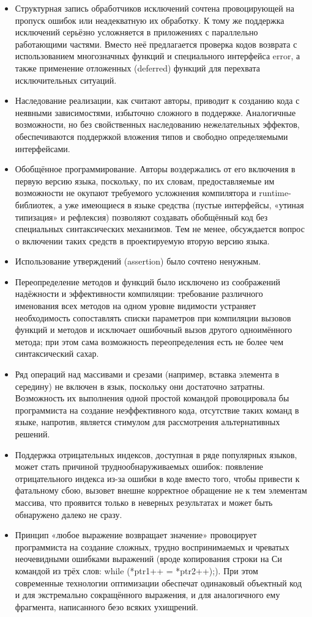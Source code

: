 \begin{itemize}
    \item Структурная запись обработчиков исключений сочтена провоцирующей на пропуск ошибок или неадекватную их обработку. К тому же поддержка исключений серьёзно усложняется в приложениях с параллельно работающими частями. Вместо неё предлагается проверка кодов возврата с использованием многозначных функций и специального интерфейса error, а также применение отложенных (deferred) функций для перехвата исключительных ситуаций.
    \item Наследование реализации, как считают авторы, приводит к созданию кода с неявными зависимостями, избыточно сложного в поддержке. Аналогичные возможности, но без свойственных наследованию нежелательных эффектов, обеспечиваются поддержкой вложения типов и свободно определяемыми интерфейсами.
    \item Обобщённое программирование. Авторы воздержались от его включения в первую версию языка, поскольку, по их словам, предоставляемые им возможности не окупают требуемого усложнения компилятора и runtime-библиотек, а уже имеющиеся в языке средства (пустые интерфейсы, «утиная типизация» и рефлексия) позволяют создавать обобщённый код без специальных синтаксических механизмов. Тем не менее, обсуждается вопрос о включении таких средств в проектируемую вторую версию языка.
    \item Использование утверждений (assertion) было сочтено ненужным.
    \item Переопределение методов и функций было исключено из соображений надёжности и эффективности компиляции: требование различного именования всех методов на одном уровне видимости устраняет необходимость сопоставлять списки параметров при компиляции вызовов функций и методов и исключает ошибочный вызов другого одноимённого метода; при этом сама возможность переопределения есть не более чем синтаксический сахар.
    \item Ряд операций над массивами и срезами (например, вставка элемента в середину) не включен в язык, поскольку они достаточно затратны. Возможность их выполнения одной простой командой провоцировала бы программиста на создание неэффективного кода, отсутствие таких команд в языке, напротив, является стимулом для рассмотрения альтернативных решений.
    \item Поддержка отрицательных индексов, доступная в ряде популярных языков, может стать причиной труднообнаруживаемых ошибок: появление отрицательного индекса из-за ошибки в коде вместо того, чтобы привести к фатальному сбою, вызовет внешне корректное обращение не к тем элементам массива, что проявится только в неверных результатах и может быть обнаружено далеко не сразу.
    \item Принцип «любое выражение возвращает значение» провоцирует программиста на создание сложных, трудно воспринимаемых и чреватых неочевидными ошибками выражений (вроде копирования строки на Си командой из трёх слов: while (*ptr1++ = *ptr2++);). При этом современные технологии оптимизации обеспечат одинаковый объектный код и для экстремально сокращённого выражения, и для аналогичного ему фрагмента, написанного безо всяких ухищрений.
\end{itemize}


